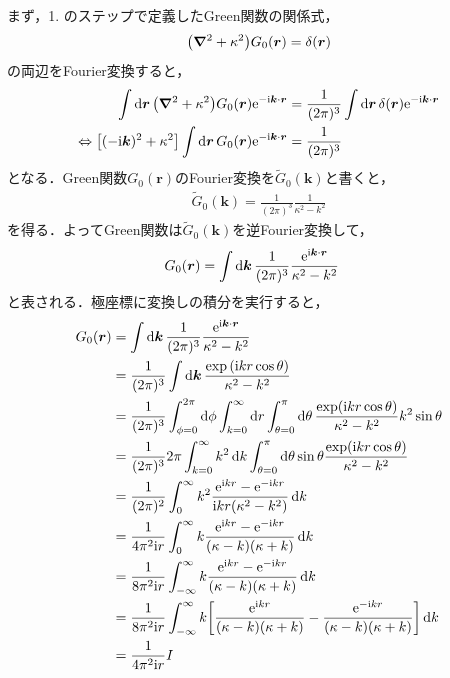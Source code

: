 \documentclass{report}
\begin{document}
    \par
    まず，1. のステップで定義したGreen関数の関係式，
    \begin{align}
      \qty(\grad^2 + \kappa^2)G_0(\bm{r}) = \delta(\bm{r})
    \end{align}
    の両辺をFourier変換すると，
    \begin{align}
      \int\dd{\bm{r}} \qty(\grad^2 + \kappa^2) G_0(\bm{r}) \mathrm{e}^{-\mathrm{i}\bm{k} \cdot \bm{r}} &= \frac{1}{(2\pi)^3}\int\dd{\bm{r}} \delta(\bm{r})\mathrm{e}^{-\mathrm{i}\bm{k}\cdot\bm{r}} \\
      \Leftrightarrow \qty[(-\mathrm{i}\bm{k})^2 + \kappa^2] \int\dd{\bm{r}} G_0(\bm{r}) \mathrm{e}^{-\mathrm{i} \bm{k}\cdot \bm{r}} &= \frac{1}{(2\pi)^3}
    \end{align}
    となる．Green関数$G_0(\bm{r})$のFourier変換を$\tilde{G}_0(\bm{k})$と書くと，
    \begin{align}
      \tilde{G}_0(\bm{k}) = \frac{1}{(2\pi)^3}\frac{1}{\kappa^2 - k^2}
    \end{align}
    を得る．よってGreen関数は$\tilde{G}_0(\bm{k})$を逆Fourier変換して，
    \begin{align}
      G_0(\bm{r}) &= \int\dd{\bm{k}} \frac{1}{(2\pi)^3}\frac{\mathrm{e}^{\mathrm{i}\bm{k} \cdot \bm{r}}}{\kappa^2 - k^2}\label{g-tilde-to-gr}
    \end{align}
    と表される．極座標に変換しの積分を実行すると，
    \begin{align}
      G_0(\bm{r}) &= \int\dd{\bm{k}} \frac{1}{(2\pi)^3}\frac{\mathrm{e}^{\mathrm{i}\bm{k} \cdot \bm{r}}}{\kappa^2 - k^2}\\ 
      &= \frac{1}{(2\pi)^3} \int\dd{\bm{k}} \frac{\exp\qty(\mathrm{i} kr\cos\theta)}{\kappa^2 - k^2} \\ 
      &= \frac{1}{(2\pi)^3} \int_{\phi = 0}^{2\pi}\dd{\phi}\int_{k = 0}^{\infty}\dd{r}\int_{\theta = 0}^{\pi}\dd{\theta} \frac{\exp(\mathrm{i} kr \cos \theta)}{\kappa^2 - k^2} k^2\sin\theta \\
      &= \frac{1}{(2\pi)^3} 2\pi \int_{k = 0}^{\infty} k^2 \dd{k} \int_{\theta = 0}^{\pi}\dd{\theta} \sin\theta\frac{\exp(\mathrm{i} k r\cos\theta)}{\kappa^2 - k^2} \\
      &= \frac{1}{(2\pi)^2} \int_{0}^{\infty}k^2\frac{\mathrm{e}^{\mathrm{i} kr} - \mathrm{e}^{-\mathrm{i} kr}}{\mathrm{i} kr\qty(\kappa^2 - k^2)}\dd{k} \\
      &= \frac{1}{4\pi^2\mathrm{i} r} \int_{0}^{\infty}k \frac{\mathrm{e}^{\mathrm{i} kr} - \mathrm{e}^{-\mathrm{i} kr}}{(\kappa - k)(\kappa + k)}\dd{k} \\
      &= \frac{1}{8\pi^2\mathrm{i} r} \int_{-\infty}^{\infty}k \frac{\mathrm{e}^{\mathrm{i} kr} - \mathrm{e}^{-\mathrm{i} kr}}{(\kappa - k)(\kappa + k)}\dd{k} \\
      &= \frac{1}{8\pi^2\mathrm{i} r} \int_{-\infty}^{\infty}k \qty[\frac{\mathrm{e}^{\mathrm{i} kr}}{(\kappa - k)(\kappa + k)} - \frac{\mathrm{e}^{-\mathrm{i} kr}}{(\kappa - k)(\kappa + k)}]\dd{k} \\
      &= \frac{1}{4\pi^2 \mathrm{i} r}I
    \end{align}
\end{document}
